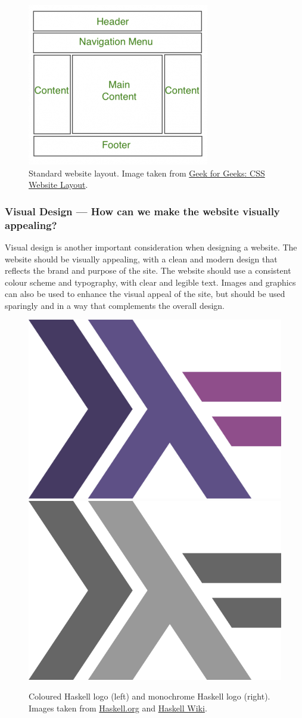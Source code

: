 \documentclass[../main.tex]{subfiles}
\begin{document}
                \begin{figure}[H]
                    \centering
                    \includegraphics[width=0.45\linewidth]{images/webLayout.png}
                        \caption{Standard website layout.
                            Image taken from \href{https://www.geeksforgeeks.org/css-website-layout/}{Geek
                                    for Geeks: CSS Website Layout}.
                        }
                        \label{fig:webLayout}
                \end{figure}

            \subsubsection{Visual Design — How can we make the website visually appealing?}
                Visual design is another important consideration when designing a website.
                The website should be visually appealing, with a clean and modern design that
                    reflects the brand and purpose of the site.
                The website should use a consistent colour scheme and typography, with clear
                    and legible text.
                Images and graphics can also be used to enhance the visual appeal of the site,
                    but should be used sparingly and in a way that complements the overall design.

                \begin{figure}[H]
                    \centering
                    \includegraphics[width=0.25\linewidth]{images/haskell.png}
                    \includegraphics[width=0.25\linewidth]{images/haskellGrey.png}
                        \caption{Coloured Haskell logo (left) and monochrome Haskell logo (right).
                            Images taken from \href{https://www.haskell.org/}{Haskell.org} and
                                \href{https://wiki.haskell.org/Haskell_logos}{Haskell Wiki}.
                        }
                        \label{fig:haskell}
                \end{figure}
\end{document}
